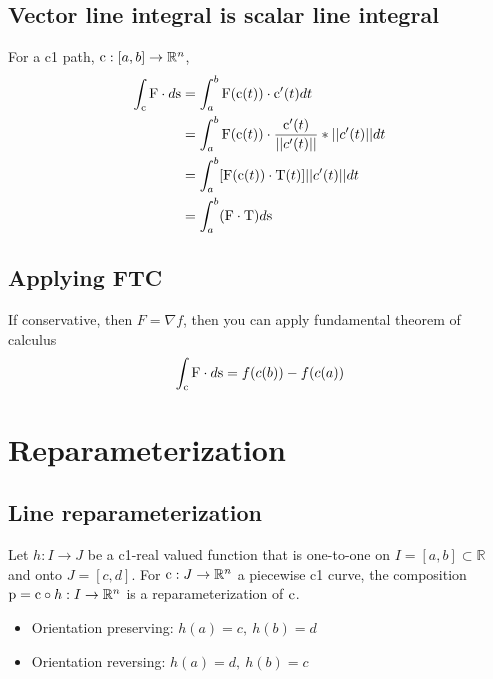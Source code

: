 \subsection*{Vector line integral is scalar line integral}
For a c1 path, $\textrm{c}:[a,b]\to\mathbb{R}^n$, 
\begin{align*}
\int_{\textrm{c}}\textrm{F}\cdot d\textrm{s} &= \int_{a}^{b}\textrm{F}(\textrm{c}(t))\cdot \textrm{c}'(t) dt\\
&= \int_{a}^{b}\textrm{F}(\textrm{c}(t))\cdot \frac{\textrm{c}'(t) }{||c'(t)||} * ||c'(t)|| dt\\
&= \int_{a}^{b}[\textrm{F}(\textrm{c}(t))\cdot \textrm{T}(t) ]||c'(t)|| dt\\
&= \int_{a}^{b}(\textrm{F}\cdot \textrm{T}) d\textrm{s}
\end{align*}
\subsection*{Applying FTC}
If conservative, then $F = \nabla f$, then you can apply fundamental theorem of calculus
$$\int_{\textrm{c}}\textrm{F}\cdot d\textrm{s}=f(c(b)) - f(c(a))$$

\section*{Reparameterization}
\subsection*{Line reparameterization}
Let $h:I\to J$ be a c1-real valued function that is one-to-one on $I=[a,b]\subset \mathbb{R}$ and onto $J=[c,d]$. For $\textrm{c}:J\to\mathbb{R}^n$ a piecewise c1 curve, the composition $\textrm{p}=\textrm{c}\circ h:I\to\mathbb{R}^n$ is a reparameterization of $\textrm{c}$.
\begin{itemize}
    \item Orientation preserving: $h(a)=c,~ h(b)=d$
    \item Orientation reversing: $h(a)=d,~ h(b)=c$
\end{itemize}

